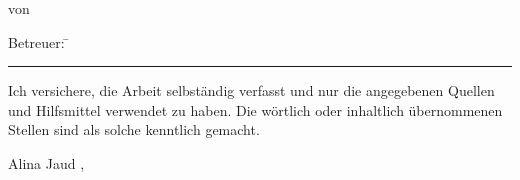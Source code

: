 \begin{titlepage}
{\begin{flushleft}
	\vspace{2cm}\hspace*{-1.7cm}						%
	\parbox[t][3cm][t]{13.5cm}
		{
			\LARGE	
			\centerline{\doctype}
			\centerline{von}
			\centerline{\bfseries\docauthor}
		} 		
\end{flushleft}
	\ifthenelse{\equal{\betreuerII}{}}
	{
		\vspace*{2cm}\hspace*{-1.7cm}
	}
	{
		\vspace*{2cm}\vspace*{-\baselineskip}\hspace*{-1.7cm}
	}
	\parbox[t][1cm][t]{13.5cm}
	{
		\ifthenelse{\equal{\betreuerII}{}}
		{
		}
		{
		\begin{tabbing}
			\Large\sffamily Betreuer: \= \Large\sffamily\bfseries\betreuerI\\
			\> \Large\sffamily\bfseries\betreuerII
		\end{tabbing}
		\vspace*{-\baselineskip}
		}
		\vspace*{0.5cm}
		\hrule
		\vspace*{0.5cm}
		\leftline{\Large\sffamily \monthword{\month}~\the\year}																		
	}
}
\cleardoublepage

\pagestyle{empty}
\vspace*{0.1cm}
Ich versichere, die Arbeit selbständig verfasst und nur die angegebenen Quellen und Hilfsmittel verwendet zu haben. Die wörtlich oder inhaltlich übernommenen Stellen sind als solche kenntlich gemacht. 
\vspace*{3cm}
\begin{center}
Alina Jaud \doclocation, \docdate
\end{center}
\cleardoublepage


\end{titlepage}
